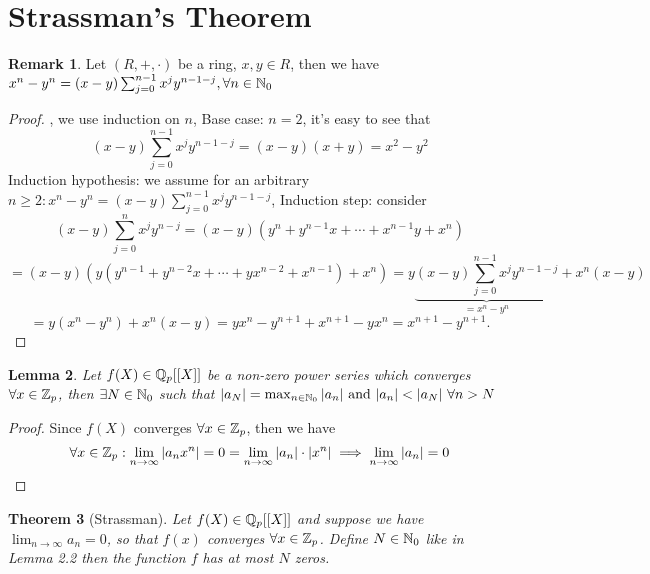\documentclass[a4paper]{article}
\theoremstyle{plain}
\newtheorem{thm}{Theorem}[section]
\newtheorem{lemm}[thm]{Lemma}
\theoremstyle{definition}
\newtheorem{rem}[thm]{Remark}
\begin{document}
\section{Strassman's Theorem}
\begin{rem} %
  Let $(R, +, \cdot)$ be a ring, $x, y \in R$, then we have $x^{n}-y^{n} = (x-y)\sum_{j=0}^{n-1}x^{j}y^{n-1-j}, \forall n \in \Bbb N_{0}$
\end{rem}
\begin{proof} %
    , we use induction on $n$,
    Base case: $n = 2$, it's easy to see that
    $$(x-y)\sum_{j=0}^{n-1}x^{j}y^{n-1-j} = (x-y)(x+y) = x^{2} - y^{2}$$
    Induction hypothesis: we assume for an arbitrary $n \geq 2: x^{n}-y^{n} = (x-y)\sum_{j=0}^{n-1}x^{j}y^{n-1-j}$,
    Induction step: consider
    $$(x-y)\sum_{j=0}^{n}x^{j}y^{n-j} = (x-y)(y^{n} + y^{n-1}x + \cdots + x^{n-1}y + x^{n})$$
    $$ = (x-y)(y(y^{n-1} + y^{n-2}x + \cdots + yx^{n-2} + x^{n-1}) + x^{n}) = y\underbrace{(x-y)\sum_{j=0}^{n-1}x^{j}y^{n-1-j}}_{= x^{n}-y^{n}} + x^{n}(x-y)$$
    $$ = y(x^{n} - y^{n}) + x^{n}(x-y) = yx^{n} - y^{n+1} + x^{n+1} - yx^{n} = x^{n+1} - y^{n+1}.$$
\end{proof}
\begin{lemm}
  Let $f(X) \in \Bbb Q_{p}[[X]]$ be a non-zero power series which converges $\forall x \in \Bbb Z_{p}$, then $\exists N \in \Bbb N_{0}$ such that $|a_{N}| = \max_{n \in \Bbb N_{0}}|a_{n}| \text{ and } |a_{n}| < |a_{N}|\ \forall n > N$
\end{lemm}
\begin{proof}
  Since $f(X)$ converges $\forall x \in \Bbb Z_{p}$, then we have
  $$\forall x \in \Bbb Z_{p} : \lim_{n \to \infty}|a_{n}x^{n}| = 0 = \lim_{n \to \infty}|a_{n}|\cdot|x^{n}| \implies \lim_{n \to \infty}|a_{n}| = 0$$
\end{proof}
\begin{thm}[Strassman] %
Let $f(X) \in \Bbb Q_{p}[[X]]$ and suppose we have $\lim_{n \to \infty}a_{n} = 0$, so that $f(x)$ converges $\forall x \in \Bbb Z_{p}$. Define $N \in \Bbb N_{0}$ like in Lemma 2.2
then the function $f$ has at most $N$ zeros.
\end{thm}
\end{document}
